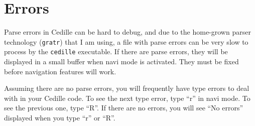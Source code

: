\documentclass{article}
\begin{document}
\section{Errors}

Parse errors in Cedille can be hard to debug, and due to the
home-grown parser technology (\verb|gratr|) that I am using, a file
with parse errors can be very slow to process by the \verb|cedille|
executable.  If there are parse errors, they will be displayed in a
small buffer when navi mode is activated.  They must be fixed before
navigation features will work.

Assuming there are no parse errors, you will frequently have type
errors to deal with in your Cedille code.  To see the next type error,
type ``r'' in navi mode.  To see the previous one, type ``R''.  If
there are no errors, you will see ``No errors'' displayed when you
type ``r'' or ``R''.
\end{document}

